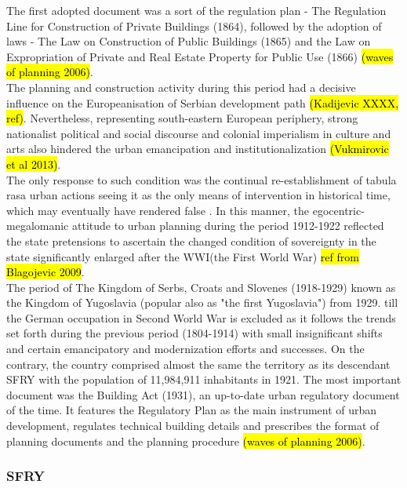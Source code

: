 \documentclass[11pt]{report}
\begin{document}
The first adopted document was a sort of the regulation plan - The Regulation  Line  for  Construction  of  Private  Buildings (1864), followed by the adoption of laws - The Law on Construction of Public Buildings (1865) and the Law on Expropriation of Private and Real Estate Property for Public Use (1866) \hl{(waves of planning 2006)}.
\\
The planning and construction activity during this period had a decisive influence on the Europeanisation of Serbian development path \hl{(Kadijevic XXXX, ref)}. Nevertheless, representing south-eastern European periphery, strong nationalist political and social discourse and colonial imperialism in culture and arts also hindered the urban emancipation and institutionalization \hl{(Vukmirovic et al 2013)}.
\\
The only response to such condition was the continual re-establishment of tabula rasa urban actions seeing it as the only means of intervention in historical time, which may eventually have rendered false \cite{Blagojevic 2009}. In this manner, the egocentric-megalomanic attitude to urban planning during the period 1912-1922 reflected the state pretensions to ascertain the changed condition of sovereignty in the state significantly enlarged after the WWI(the First World War) \hl{ref from Blagojevic 2009}.
\\
The period of The Kingdom of Serbs, Croats and Slovenes (1918-1929) known as the Kingdom of Yugoslavia (popular also as "the first Yugoslavia") from 1929. till the German occupation in Second World War is excluded as it follows the trends set forth during the previous period (1804-1914) with small insignificant shifts and  certain emancipatory and modernization efforts and successes. On the contrary, the country comprised almost the same the territory as its descendant SFRY with the population of 11,984,911 inhabitants in 1921. The most important document was the Building Act (1931), an up-to-date urban regulatory document of the time. It features the Regulatory Plan as the main instrument of urban development, regulates technical building details and prescribes the format of planning documents and the planning procedure \hl{(waves of planning 2006)}.

\subsubsection{SFRY}
\end{document}
